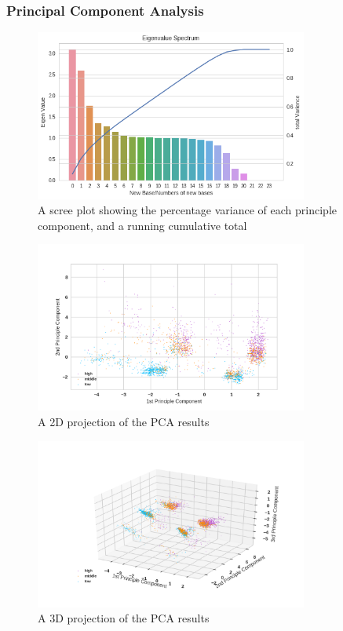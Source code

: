 \documentclass[12pt]{article}
\begin{document}
\subsubsection{Principal Component Analysis}
\begin{figure}[htb]
\centering
\includegraphics[width = 0.8\textwidth]{images/eigenvalues1.png}
\caption{ A scree plot showing the percentage variance of each principle component, and a running cumulative total}
\label{fig:eigenvalues1}
\end{figure}
\begin{figure}[htb]
\centering
\includegraphics[width = 0.8\textwidth]{images/pca1-2d.png}
\caption{A 2D projection of the PCA results}
\label{fig:pca1-2d}
\end{figure}
\begin{figure}[htb]
\centering
\includegraphics[width = 0.8\textwidth]{images/pca1-3d.png}
\caption{A 3D projection of the PCA results}
\label{fig:pca1-3d}
\end{figure}
\end{document}
